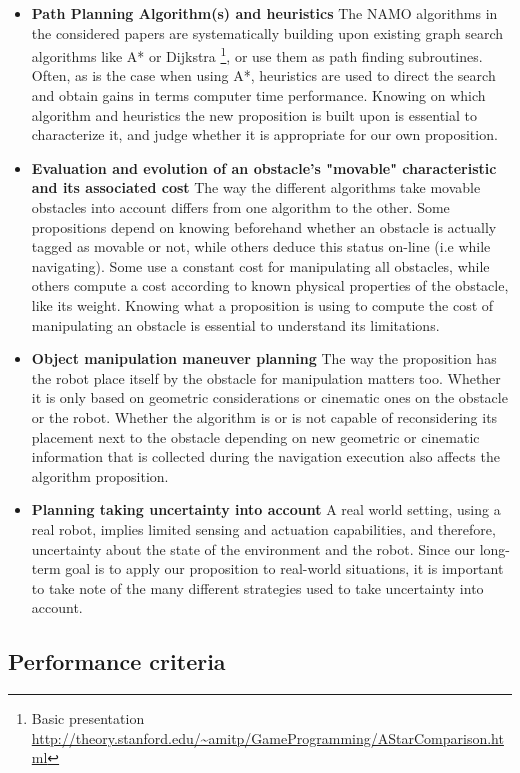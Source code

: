 \begin{itemize}
  \item \textbf{Path Planning Algorithm(s) and heuristics} The NAMO algorithms in the considered papers are systematically building upon existing graph search algorithms like A* or Dijkstra \footnote{Basic presentation \url{http://theory.stanford.edu/~amitp/GameProgramming/AStarComparison.html}}, or use them as path finding subroutines. Often, as is the case when using A*, heuristics are used to direct the search and obtain gains in terms computer time performance. Knowing on which algorithm and heuristics the new proposition is built upon is essential to characterize it, and judge whether it is appropriate for our own proposition.
  \item \textbf{Evaluation and evolution of an obstacle's "movable" characteristic and its associated cost} The way the different algorithms take movable obstacles into account differs from one algorithm to the other. Some propositions depend on knowing beforehand whether an obstacle is actually tagged as movable or not, while others deduce this status on-line (i.e while navigating). Some use a constant cost for manipulating all obstacles, while others compute a cost according to known physical properties of the obstacle, like its weight. Knowing what a proposition is using to compute the cost of manipulating an obstacle is essential to understand its limitations.
  \item \textbf{Object manipulation maneuver planning} The way the proposition has the robot place itself by the obstacle for manipulation matters too. Whether it is only based on geometric considerations or cinematic ones on the obstacle or the robot. Whether the algorithm is or is not capable of reconsidering its placement next to the obstacle depending on new geometric or cinematic information that is collected during the navigation execution also affects the algorithm proposition.
  \item \textbf{Planning taking uncertainty into account} A real world setting, using a real robot, implies limited sensing and actuation capabilities, and therefore, uncertainty about the state of the environment and the robot. Since our long-term goal is to apply our proposition to real-world situations, it is important to take note of the many different strategies used to take uncertainty into account.
\end{itemize}

\subsection{Performance criteria}

